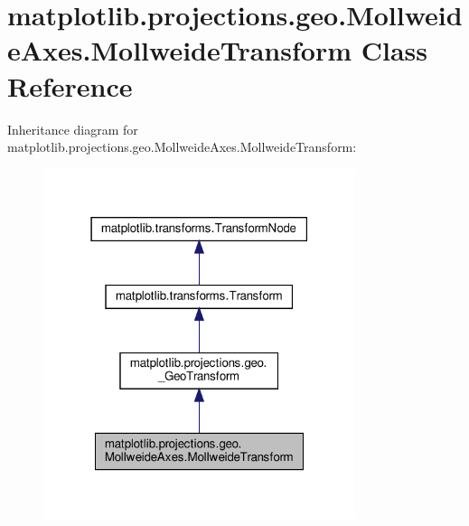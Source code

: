 \hypertarget{classmatplotlib_1_1projections_1_1geo_1_1MollweideAxes_1_1MollweideTransform}{}\section{matplotlib.\+projections.\+geo.\+Mollweide\+Axes.\+Mollweide\+Transform Class Reference}
\label{classmatplotlib_1_1projections_1_1geo_1_1MollweideAxes_1_1MollweideTransform}


Inheritance diagram for matplotlib.\+projections.\+geo.\+Mollweide\+Axes.\+Mollweide\+Transform\+:
\nopagebreak
\begin{figure}[H]
\begin{center}
\leavevmode
\includegraphics[width=259pt]{classmatplotlib_1_1projections_1_1geo_1_1MollweideAxes_1_1MollweideTransform__inherit__graph}
\end{center}
\end{figure}


